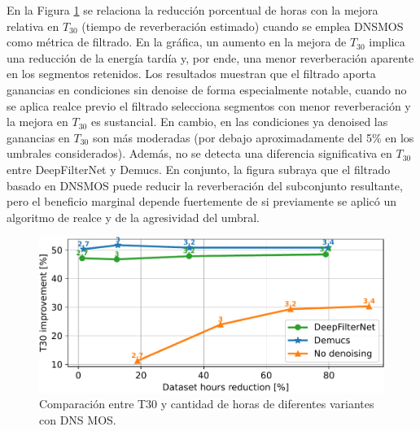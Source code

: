 En la Figura \ref{fig:T30_vs_horas} se relaciona la reducción porcentual de horas con la mejora relativa en \(T_{30}\) (tiempo de reverberación estimado) cuando se emplea DNSMOS como métrica de filtrado. En la gráfica, un aumento en la mejora de \(T_{30}\) implica una reducción de la energía tardía y, por ende, una menor reverberación aparente en los segmentos retenidos. Los resultados muestran que el filtrado aporta ganancias en condiciones sin denoise de forma especialmente notable, cuando no se aplica realce previo el filtrado selecciona segmentos con menor reverberación y la mejora en \(T_{30}\) es sustancial. En cambio, en las condiciones ya denoised las ganancias en \(T_{30}\) son más moderadas (por debajo aproximadamente del 5\% en los umbrales considerados). Además, no se detecta una diferencia significativa en \(T_{30}\) entre DeepFilterNet y Demucs. En conjunto, la figura subraya que el filtrado basado en DNSMOS puede reducir la reverberación del subconjunto resultante, pero el beneficio marginal depende fuertemente de si previamente se aplicó un algoritmo de realce y de la agresividad del umbral.

\begin{figure}[h]
  \centering
  \centerline{\includegraphics[width=12cm]{Figuras/Pipeline/T30 vs horas (dnsmos).pdf}}
  \caption{Comparación entre T30 y cantidad de horas de diferentes variantes con DNS MOS.}
    \label{fig:T30_vs_horas}
\end{figure}

